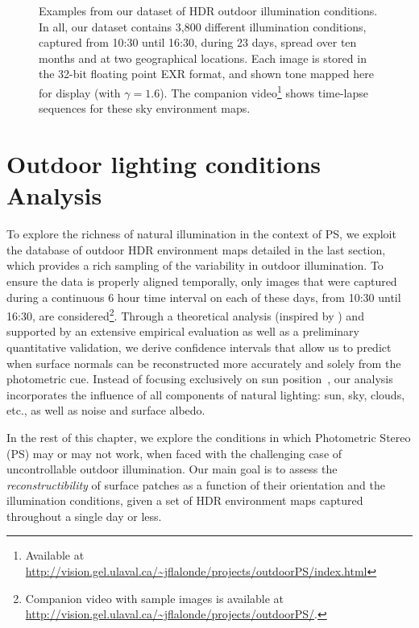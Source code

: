 \begin{figure}
\begin{tabular}{@{}rcccccccccccc@{}}
    \\

    \end{tabular}
    \caption[HDRDB dataset excerpt]{Examples from our dataset of HDR outdoor illumination conditions. In all, our dataset contains 3,800 different illumination conditions, captured from 10{:}30 until 16{:}30, during 23 days, spread over ten months and at two geographical locations. Each image is stored in the 32-bit floating point EXR format, and shown tone mapped here for display (with $\gamma = 1.6$). The companion video\footnote{Available at \url{http://vision.gel.ulaval.ca/~jflalonde/projects/outdoorPS/index.html}} shows time-lapse sequences for these sky environment maps.}
    \label{fig:database}
\end{figure}

\section{Outdoor lighting conditions Analysis}

To explore the richness of natural illumination in the context of PS, we exploit the database of outdoor HDR environment maps detailed in the last section, which provides a rich sampling of the variability in outdoor illumination. To ensure the data is properly aligned temporally, only images that were captured during a continuous 6 hour time interval on each of these days, from 10{:}30 until 16{:}30, are considered\footnote{Companion video with sample images is available at \url{http://vision.gel.ulaval.ca/~jflalonde/projects/outdoorPS/}.}. Through a theoretical analysis (inspired by \cite{sun-ivc-07}) and supported by an extensive empirical evaluation as well as a preliminary quantitative validation, we derive confidence intervals that allow us to predict when surface normals can be reconstructed more accurately and solely from the photometric cue. Instead of focusing exclusively on sun position~\cite{shen-pg-14}, our analysis incorporates the influence of all components of natural lighting: sun, sky, clouds, etc., as well as noise and surface albedo.

In the rest of this chapter, we explore the conditions in which Photometric Stereo (PS) may or may not work, when faced with the challenging case of uncontrollable outdoor illumination. Our main goal is to assess the \emph{reconstructibility} of surface patches as a function of their orientation and the illumination conditions, given a set of HDR environment maps captured throughout a single day or less.

